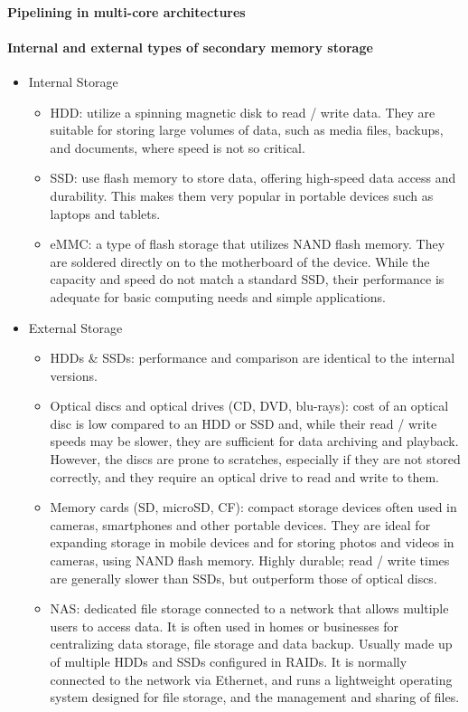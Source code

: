 \paragraph{Pipelining in multi-core architectures}
\paragraph{Internal and external types of secondary memory storage}
\begin{itemize}
	\item Internal Storage
	\begin{itemize}
	\item HDD: utilize a spinning magnetic disk to read / write data. They are suitable for storing large volumes of data, such as media files, backups, and documents, where speed is not so critical. 
	\item SSD: use flash memory to store data, offering high-speed data access and durability. This makes them very popular in portable devices such as laptops and tablets.
	\item eMMC: a type of flash storage that utilizes NAND flash memory. They are soldered directly on to the motherboard of the device. While the capacity and speed do not match a standard SSD, their performance is adequate for basic computing needs and simple applications. 
\end{itemize}
	\item External Storage
\begin{itemize}
\item HDDs \& SSDs: performance and comparison are identical to the internal versions. 
\item Optical discs and optical drives (CD, DVD, blu-rays): cost of an optical disc is low compared to an HDD or SSD and, while their read / write speeds may be slower, they are sufficient for data archiving and playback. However, the discs are prone to scratches, especially if they are not stored correctly, and they require an optical drive to read and write to them.
\item Memory cards (SD, microSD, CF): compact storage devices often used in cameras, smartphones and other portable devices. They are ideal for expanding storage in mobile devices and for storing photos 
and videos in cameras, using NAND flash memory. Highly durable; read / write times are generally slower 
than SSDs, but outperform those of optical discs. 
\item NAS: dedicated file storage connected to a network that allows multiple users to access 
data. It is often used in homes or businesses for centralizing data storage, file storage 
and data backup. Usually made up of multiple HDDs and SSDs configured in RAIDs. It is normally connected to the network via Ethernet, and runs a lightweight operating system designed for file storage, and the management and sharing of files. 
\end{itemize}
\end{itemize}
